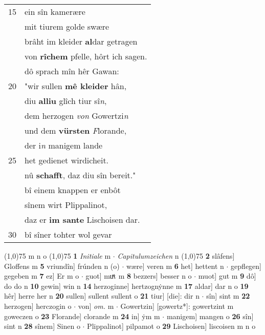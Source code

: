 \documentclass[8pt,a4paper,notitlepage]{article}
\begin{document}
\begin{table}[ht]
\begin{minipage}[t]{0.5\linewidth}
\begin{tabular}{rl}
15 & ein sîn kamerære\\ 
 & mit tiurem golde swære\\ 
 & brâht im kleider \textbf{al}dar getragen\\ 
 & von \textbf{rîchem} pfelle, hôrt ich sagen.\\ 
 & dô sprach mîn hêr Gawan:\\ 
20 & "wir sullen \textbf{mê kleider} hân,\\ 
 & diu \textbf{alliu} glîch tiur sî\textit{n},\\ 
 & dem herzogen \textit{von} Gowertzi\textit{n}\\ 
 & und dem \textbf{vürsten} \textit{F}lorande,\\ 
 & der i\textit{n} manigem lande\\ 
25 & het gedienet wirdicheit.\\ 
 & nû \textbf{schafft}, daz diu sîn bereit."\\ 
 & bî einem knappen er enbôt\\ 
 & sînem wirt Plippalinot,\\ 
 & daz er \textbf{im sante} Lischoisen dar.\\ 
30 & bî sîner tohter wol gevar\\ 
\end{tabular}
\scriptsize
\line(1,0){75} \newline
m n o \newline
\line(1,0){75} \newline
\textbf{1} \textit{Initiale} m   $\cdot$ \textit{Capitulumzeichen} n  \newline
\line(1,0){75} \newline
\textbf{2} slâfens] Gloffens m \textbf{5} vriundîn] frúnden n (o)  $\cdot$ wære] veren m \textbf{6} het] hettent n  $\cdot$ gepflegen] gegeben m \textbf{7} ez] Er m o  $\cdot$ guot] muͯt m \textbf{8} bezzers] besser n o  $\cdot$ muot] gut m \textbf{9} dô] do do n \textbf{10} gewin] win n \textbf{14} herzoginne] hertzognẏnne m \textbf{17} aldar] dar n o \textbf{19} hêr] herre her n \textbf{20} sullen] sullent sullent o \textbf{21} tiur] [die]: dir n  $\cdot$ sîn] sint m \textbf{22} herzogen] herczogin o  $\cdot$ von] \textit{om.} m  $\cdot$ Gowertzin] [gowertz*]: gowertzint m goweczen o \textbf{23} Florande] clorande m \textbf{24} in] ẏm m  $\cdot$ manigem] mangen o \textbf{26} sîn] sint n \textbf{28} sînem] Sinen o  $\cdot$ Plippalinot] pilpamot o \textbf{29} Lischoisen] liscoisen m n o \newline
\end{minipage}
\end{table}
\end{document}
